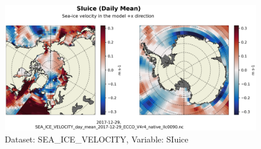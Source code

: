 \begin{figure}[H]
\centering
\includegraphics[scale=0.55]{../images/plots/native_plots/Sea-Ice_Velocity/SIuice.png}
\caption{Dataset: SEA\_ICE\_VELOCITY, Variable: SIuice}
\label{tab:table-SEA_ICE_VELOCITY_SIuice-Plot}
\end{figure}
\pagebreak

